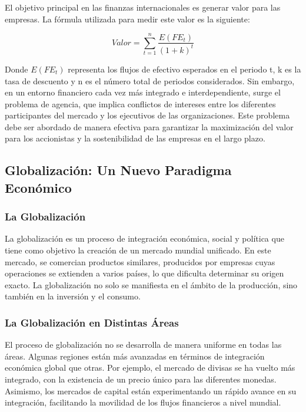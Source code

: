 \documentclass[
  jou,
  floatsintext,
  longtable,
  a4paper,
  nolmodern,
  notxfonts,
  notimes,
  12pt,
  colorlinks=true,linkcolor=blue,citecolor=blue,urlcolor=blue]{apa7}
\begin{document}
El objetivo principal en las finanzas internacionales es generar valor
para las empresas. La fórmula utilizada para medir este valor es la
siguiente:

\[
Valor = \sum_{t=1}^{n} \frac{E(FE_t)}{(1+k)^t}
\]

Donde \(E(FE_t)\) representa los flujos de efectivo esperados en el
periodo t, k es la tasa de descuento y n es el número total de periodos
considerados. Sin embargo, en un entorno financiero cada vez más
integrado e interdependiente, surge el problema de agencia, que implica
conflictos de intereses entre los diferentes participantes del mercado y
los ejecutivos de las organizaciones. Este problema debe ser abordado de
manera efectiva para garantizar la maximización del valor para los
accionistas y la sostenibilidad de las empresas en el largo plazo.

\subsection{Globalización: Un Nuevo Paradigma
Económico}\label{globalizaciuxf3n-un-nuevo-paradigma-econuxf3mico}

\subsubsection{La Globalización}\label{la-globalizaciuxf3n}

La globalización es un proceso de integración económica, social y
política que tiene como objetivo la creación de un mercado mundial
unificado. En este mercado, se comercian productos similares, producidos
por empresas cuyas operaciones se extienden a varios países, lo que
dificulta determinar su origen exacto. La globalización no solo se
manifiesta en el ámbito de la producción, sino también en la inversión y
el consumo.

\subsubsection{La Globalización en Distintas
Áreas}\label{la-globalizaciuxf3n-en-distintas-uxe1reas}

El proceso de globalización no se desarrolla de manera uniforme en todas
las áreas. Algunas regiones están más avanzadas en términos de
integración económica global que otras. Por ejemplo, el mercado de
divisas se ha vuelto más integrado, con la existencia de un precio único
para las diferentes monedas. Asimismo, los mercados de capital están
experimentando un rápido avance en su integración, facilitando la
movilidad de los flujos financieros a nivel mundial.
\end{document}
